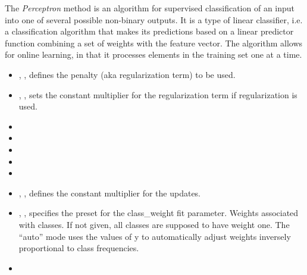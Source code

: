 The \textit{Perceptron} method is an algorithm for supervised classification of
an input into one of several possible non-binary outputs.
%
It is a type of linear classifier, i.e. a classification algorithm that makes
its predictions based on a linear predictor function combining a set of weights
with the feature vector.
%
The algorithm allows for online learning, in that it processes elements in the
training set one at a time.
%
\begin{itemize}
  \item {}, , defines
  the penalty (aka regularization term) to be used.
  \item {}, , sets the constant multiplier for the
  regularization term if regularization is used.
  \item {}
  \item {}
  \item {}
  \item {}
  \item \verDescriptionB
  \item {}, , defines the constant
  multiplier for the updates.
  \item {}, , specifies the
  preset for the class\_weight fit parameter.
  Weights associated with classes.
  If not given, all classes are supposed to have weight one.
  The ``auto'' mode uses the values of y to automatically adjust weights
  inversely proportional to class frequencies.
  \item \warmStartDescription{}
\end{itemize}

